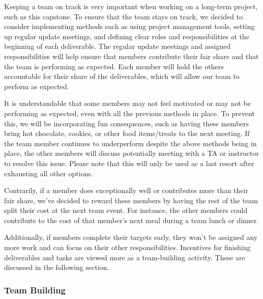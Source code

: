 \documentclass{article}
\begin{document}

Keeping a team on track is very important when working on a long-term project, such as this capstone. To ensure that the team stays on track, we decided to consider implementing methods such as using project management tools, setting up regular update meetings, and defining clear roles and responsibilities at the beginning of each deliverable. The regular update meetings and assigned responsibilities will help ensure that members contribute their fair share and that the team is performing as expected. Each member will hold the others accountable for their share of the deliverables, which will allow our team to perform as expected. 

It is understandable that some members may not feel motivated or may not be performing as expected, even with all the previous methods in place. To prevent this, we will be incorporating fun consequences, such as having these members bring hot chocolate, cookies, or other food items/treats to the next meeting. If the team member continues to underperform despite the above methods being in place, the other members will discuss potentially meeting with a TA or instructor to resolve this issue. Please note that this will only be used as a last resort after exhausting all other options. 

Contrarily, if a member does exceptionally well or contributes more than their fair share, we’ve decided to reward these members by having the rest of the team split their cost at the next team event. For instance, the other members could contribute to the cost of that member’s next meal during a team lunch or dinner. 

Additionally, if members complete their targets early, they won’t be assigned any more work and can focus on their other responsibilities. Incentives for finishing deliverables and tasks are viewed more as a team-building activity. These are discussed in the following section. 


\subsubsection*{Team Building}

\end{document}
